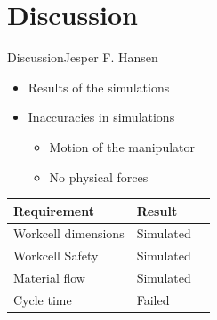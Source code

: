 \section{Discussion}
\begin{frame}{Discussion}{Jesper F. Hansen}


\begin{itemize}
    \item Results of the simulations
    \item Inaccuracies in simulations
    \begin{itemize}
        \item Motion of the manipulator
        \item No physical forces
    \end{itemize}
\end{itemize}
\begin{table}[]
    \centering
\begin{tabular}{l l l}
    \hline
    \rowcolor{beamer@barcolor}\textbf{Requirement} & \textbf{Result} \\
    \hline
    Workcell dimensions & Simulated \\
    \rowcolor{beamer@barcolor} Workcell Safety & Simulated \\
    Material flow & Simulated \\
    \rowcolor{beamer@barcolor} Cycle time & Failed \\
    \hline
\end{tabular}
\end{table}
\end{frame}

